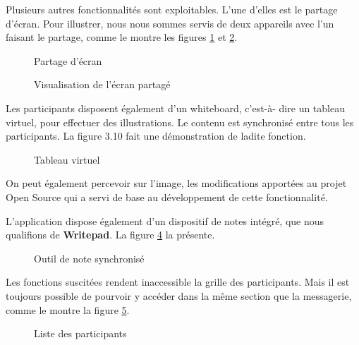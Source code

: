 Plusieurs autres fonctionnalités sont exploitables. 
L’une d’elles est le partage d'écran. Pour illustrer, nous nous sommes servis de deux appareils avec 
l’un faisant le partage, comme le montre les figures \ref{fig:sharing_screen} et \ref{fig:viewing_screen}.

\newpage
\begin{figure}[h]
  \centering
  \caption{Partage d'écran}
  \label{fig:sharing_screen}
\end{figure}

\newpage
\begin{figure}[h]
  \centering
  \caption{Visualisation de l'écran partagé}
  \label{fig:viewing_screen}
\end{figure}

Les participants disposent également d’un whiteboard, 
c'est-à- dire un tableau virtuel, pour effectuer des illustrations. 
Le contenu est synchronisé entre tous les participants. 
La figure 3.10 fait une démonstration de ladite fonction.

\begin{figure}[h]
  \centering
  \caption{Tableau virtuel}
  \label{fig:whiteboard}
\end{figure}

On peut également percevoir sur l’image, les modifications apportées au projet Open Source qui a servi de base au développement de cette fonctionnalité.

L’application dispose également d’un dispositif de notes intégré, que nous qualifions de \textbf{Writepad}. La figure \ref{fig:writepad} la présente.


\begin{figure}[h]
  \centering
  \caption{Outil de note synchronisé}
  \label{fig:writepad}
\end{figure}

Les fonctions suscitées rendent inaccessible la grille des participants. 
Mais il est toujours possible de pourvoir y accéder dans la même section que la messagerie, comme le montre la figure \ref{fig:participants_aside}.

\newpage
\begin{figure}[h]
  \centering
  \caption{Liste des participants}
  \label{fig:participants_aside}
\end{figure}

